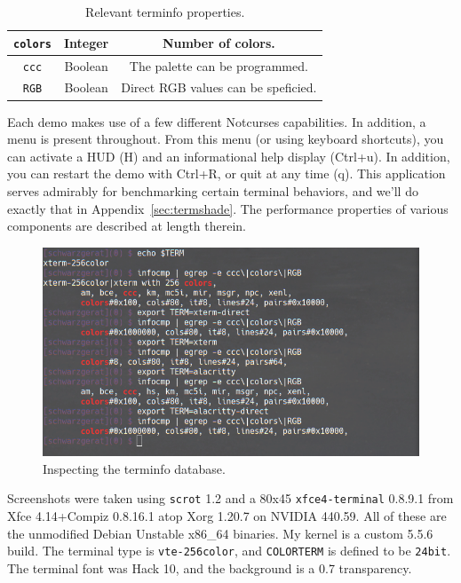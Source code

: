 \documentclass[letterpaper,10pt]{article}
\begin{document}
\begin{table}[h]
  \begin{center}
    \begin{tabular}{ |c|c|c| }
      \hline
      \texttt{colors} & Integer & Number of colors. \\
      \hline
      \texttt{ccc} & Boolean & The palette can be programmed. \\
      \hline
      \texttt{RGB} & Boolean & Direct RGB values can be speficied. \\
      \hline
    \end{tabular}
  \end{center}
  \caption{Relevant terminfo properties.}
  \label{table:terminfo}
\end{table}

Each demo makes use of a few different Notcurses capabilities. In addition,
a menu is present throughout. From this menu (or using keyboard shortcuts),
you can activate a HUD (H) and an informational help display (Ctrl+u). In
addition, you can restart the demo with Ctrl+R, or quit at any time (q). This
application serves admirably for benchmarking certain terminal behaviors, and
we'll do exactly that in Appendix~\ref{sec:termshade}. The performance
properties of various components are described at length therein.

\begin{figure}[h]
  \centering
  \includegraphics[width=.75\linewidth]{media/terminfocmp.png}
  \caption{Inspecting the terminfo database.}
  \label{fig:terminfocmp}
\end{figure}

Screenshots were taken using \texttt{scrot} 1.2 and a 80x45
\texttt{xfce4-terminal} 0.8.9.1 from Xfce 4.14+Compiz 0.8.16.1 atop Xorg
1.20.7 on NVIDIA 440.59. All of these are the unmodified Debian Unstable
x86\_64 binaries. My kernel is a custom 5.5.6 build. The terminal type is
\texttt{vte-256color}, and \texttt{COLORTERM} is defined to be
\texttt{24bit}. The terminal font was Hack 10, and the background is a 0.7
transparency.
\end{document}
